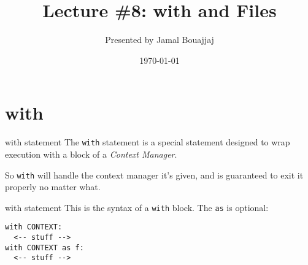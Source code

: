 %
%



\title{Lecture \#8: with and Files}
\date{\today}
\author{Presented by Jamal Bouajjaj}

\makeatletter
{}%
\makeatother



\maketitle

\section{with}

\begin{frame}[containsverbatim]{with statement}
  The \verb|with| statement is a special statement designed to wrap execution with a block of a \textit{Context Manager}.

  So \verb|with| will handle the context manager it's given, and is guaranteed to exit it properly no matter what.
\end{frame}

\begin{frame}[containsverbatim]{with statement}
  This is the syntax of a \verb|with| block. The \verb|as| is optional:
\begin{verbatim}
with CONTEXT:
  <-- stuff -->
with CONTEXT as f:
  <-- stuff -->
\end{verbatim}
\end{frame}

